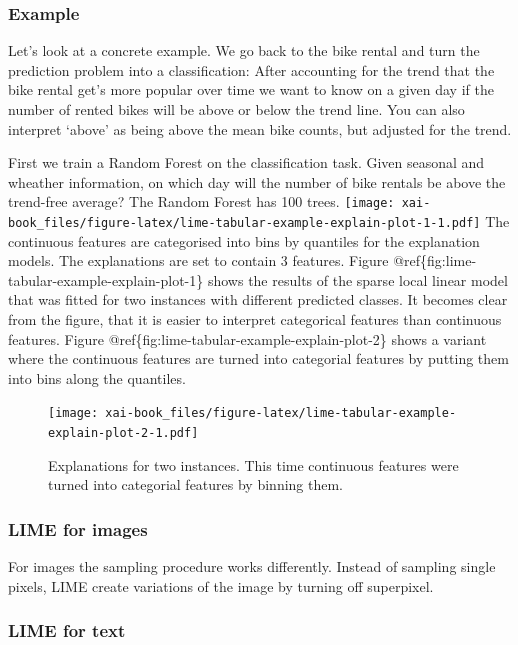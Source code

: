 \documentclass[12pt,]{krantz}
\theoremstyle{definition}
\theoremstyle{definition}
\theoremstyle{definition}
\theoremstyle{remark}
\begin{document}
\subsubsection{Example}\label{example-3}

Let's look at a concrete example. We go back to the bike rental and turn
the prediction problem into a classification: After accounting for the
trend that the bike rental get's more popular over time we want to know
on a given day if the number of rented bikes will be above or below the
trend line. You can also interpret `above' as being above the mean bike
counts, but adjusted for the trend.

First we train a Random Forest on the classification task. Given
seasonal and wheather information, on which day will the number of bike
rentals be above the trend-free average? The Random Forest has 100
trees.
\texttt{[image: xai-book\_files/figure-latex/lime-tabular-example-explain-plot-1-1.pdf]}
The continuous features are categorised into bins by quantiles for the
explanation models. The explanations are set to contain 3 features.
Figure @ref\{fig:lime-tabular-example-explain-plot-1\} shows the results
of the sparse local linear model that was fitted for two instances with
different predicted classes. It becomes clear from the figure, that it
is easier to interpret categorical features than continuous features.
Figure @ref\{fig:lime-tabular-example-explain-plot-2\} shows a variant
where the continuous features are turned into categorial features by
putting them into bins along the quantiles.

\begin{figure}
\centering
\texttt{[image: xai-book\_files/figure-latex/lime-tabular-example-explain-plot-2-1.pdf]}
\caption{\label{fig:lime-tabular-example-explain-plot-2}Explanations for two
instances. This time continuous features were turned into categorial
features by binning them.}
\end{figure}

\subsubsection{LIME for images}\label{lime-for-images}

For images the sampling procedure works differently. Instead of sampling
single pixels, LIME create variations of the image by turning off
superpixel.

\subsubsection{LIME for text}\label{lime-for-text}
\end{document}
